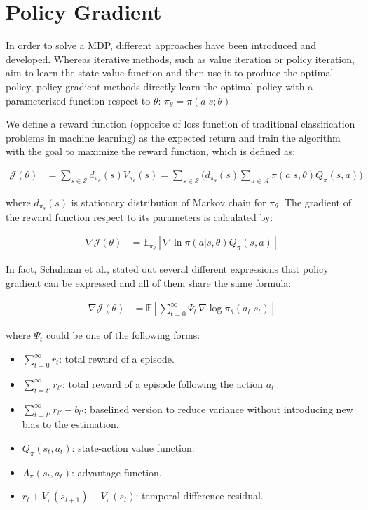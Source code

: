 \section{Policy Gradient}

In order to solve a MDP, different approaches have been introduced and developed. Whereas iterative methods, such as value iteration or policy iteration, aim to learn the state-value function and then use it to produce the optimal policy, policy gradient methods directly learn the optimal policy with a parameterized function respect to $\theta$: $\pi_{\theta} = \pi(a|s;\theta)$

We define a reward function (opposite of loss function of traditional classification problems in machine learning) as the expected return and train the algorithm with the goal to maximize the reward function, which is defined as:

\begin{align}
\mathcal{J}(\theta) &= \sum_{s \in \mathcal{S}} d_{\pi_\theta}(s) V_{\pi_\theta}(s) = \sum_{s \in \mathcal{S}} \Big( d_{\pi_\theta}(s) \sum_{a \in \mathcal{A}} \pi(a \vert s, \theta) Q_\pi(s, a) \Big)
\end{align}

where $d_{\pi_{\theta}}(s)$ is stationary distribution of Markov chain for $\pi_{\theta}$. The gradient of the reward function respect to its parameters is calculated by:

\begin{align}
\nabla \mathcal{J}(\theta) &= \mathbb{E}_{\pi_\theta} [\nabla \ln \pi(a \vert s, \theta) Q_\pi(s, a)] \label{gradient}
\end{align}

In fact, Schulman et al., \cite{schulman} stated out several different expressions that policy gradient can be expressed and all of them share the same formula:

\begin{align}
\nabla \mathcal{J}(\theta) &= \mathbb{E} \left [ \sum^{\infty}_{t=0}\Psi_t \,\nabla \log \pi_{\theta}(a_t | s_t) \right ]
\end{align}

where $\Psi_t$ could be one of the following forms:

\begin{itemize}
\item $\sum^{\infty}_{t=0} r_t$: total reward of a episode.
\item $\sum^{\infty}_{t=t'} r_{t'}$: total reward of a episode following the action $a_{t'}$.
\item $\sum^{\infty}_{t=t'} r_{t'} - b_{t'}$: baselined version to reduce variance without introducing new bias to the estimation.
\item $Q_{\pi}(s_t, a_t)$: state-action value function.
\item $A_{\pi}(s_t, a_t)$: advantage function.
\item $r_t + V_{\pi}(s_{t+1}) - V_{\pi}(s_t)$: temporal difference residual.
\end{itemize}

